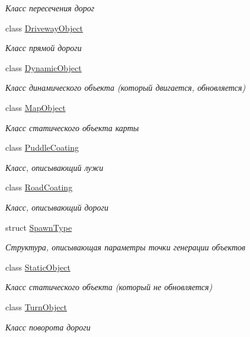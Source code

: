 \begin{DoxyCompactItemize}
\begin{DoxyCompactList}\small\item\em Класс пересечения дорог \end{DoxyCompactList}\item 
class \hyperlink{classrtm_1_1_driveway_object}{Driveway\+Object}
\begin{DoxyCompactList}\small\item\em Класс прямой дороги \end{DoxyCompactList}\item 
class \hyperlink{classrtm_1_1_dynamic_object}{Dynamic\+Object}
\begin{DoxyCompactList}\small\item\em Класс динамического объекта (который двигается, обновляется) \end{DoxyCompactList}\item 
class \hyperlink{classrtm_1_1_map_object}{Map\+Object}
\begin{DoxyCompactList}\small\item\em Класс статического объекта карты \end{DoxyCompactList}\item 
class \hyperlink{classrtm_1_1_puddle_coating}{Puddle\+Coating}
\begin{DoxyCompactList}\small\item\em Класс, описывающий лужи \end{DoxyCompactList}\item 
class \hyperlink{classrtm_1_1_road_coating}{Road\+Coating}
\begin{DoxyCompactList}\small\item\em Класс, описывающий дороги \end{DoxyCompactList}\item 
struct \hyperlink{structrtm_1_1_spawn_type}{Spawn\+Type}
\begin{DoxyCompactList}\small\item\em Структура, описывающая параметры точки генерации объектов \end{DoxyCompactList}\item 
class \hyperlink{classrtm_1_1_static_object}{Static\+Object}
\begin{DoxyCompactList}\small\item\em Класс статического объекта (который не обновляется) \end{DoxyCompactList}\item 
class \hyperlink{classrtm_1_1_turn_object}{Turn\+Object}
\begin{DoxyCompactList}\small\item\em Класс поворота дороги \end{DoxyCompactList}\item 

\end{DoxyCompactItemize}
